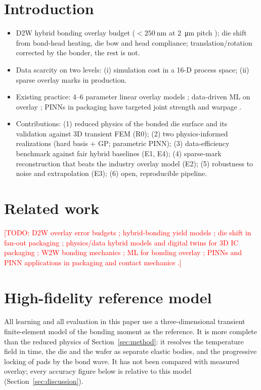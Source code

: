 \documentclass[11pt]{article}
\newcommand{\todo}[1]{\textcolor{red}{[TODO: #1]}}
\begin{document}
\section{Introduction}
\begin{itemize}
  \item D2W hybrid bonding overlay budget ($<\SI{250}{\nano\meter}$ at \SI{2}{\micro\meter} pitch \cite{bex2024}); die shift from
        bond-head heating, die bow and head compliance; translation/rotation corrected by the bonder, the rest is not.
  \item Data scarcity on two levels: (i) simulation cost in a 16-D process space; (ii) sparse overlay marks in production.
  \item Existing practice: 4--6 parameter linear overlay models \cite{bex2024}; data-driven ML on overlay \cite{james2024};
        PINNs in packaging have targeted joint strength \cite{mei2026sinteredag} and warpage \cite{warpagepinn2026}.
  \item Contributions: (1) reduced physics of the bonded die surface and its validation against 3D transient FEM (R0);
        (2) two physics-informed realizations (hard basis + GP; parametric PINN); (3) data-efficiency benchmark against
        fair hybrid baselines (E1, E4); (4) sparse-mark reconstruction that beats the industry overlay model (E2);
        (5) robustness to noise and extrapolation (E3); (6) open, reproducible pipeline.
\end{itemize}

\section{Related work}
\todo{D2W overlay error budgets \cite{bex2024}; hybrid-bonding yield models \cite{chen2025yapplus}; die shift in fan-out
packaging \cite{sung2026dieshift}; physics/data hybrid models and digital twins for 3D IC packaging \cite{datta2026digitaltwin};
W2W bonding mechanics \cite{ghosh2026w2w}; ML for bonding overlay \cite{james2024}; PINNs \cite{raissi2019pinn} and PINN
applications in packaging and contact mechanics \cite{warpagepinn2026,mei2026sinteredag,xia2024pinncontact}.}

\section{High-fidelity reference model}\label{sec:reference}
All learning and all evaluation in this paper use a three-dimensional transient finite-element model of the bonding
moment as the reference. It is more complete than the reduced physics of Section~\ref{sec:method}: it resolves the
temperature field in time, the die and the wafer as separate elastic bodies, and the progressive locking of pads by the
bond wave. It has not been compared with measured overlay; every accuracy figure below is relative to this model
(Section~\ref{sec:discussion}).
\end{document}
